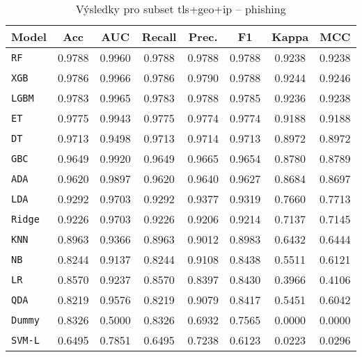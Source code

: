 \begin{table}[H]
  \centering
  \small
  \caption{Výsledky pro subset tls+geo+ip – phishing}
  \begin{tabular}{|l|c|c|c|c|c|c|c|}
    \hline
    \textbf{Model} & \textbf{Acc} & \textbf{AUC} & \textbf{Recall} & \textbf{Prec.} & \textbf{F1} & \textbf{Kappa} & \textbf{MCC} \\
    \hline
    \texttt{RF} & 0.9788 & 0.9960 & 0.9788 & 0.9788 & 0.9788 & 0.9238 & 0.9238 \\
    \texttt{XGB} & 0.9786 & 0.9966 & 0.9786 & 0.9790 & 0.9788 & 0.9244 & 0.9246 \\
    \texttt{LGBM} & 0.9783 & 0.9965 & 0.9783 & 0.9788 & 0.9785 & 0.9236 & 0.9238 \\
    \texttt{ET} & 0.9775 & 0.9943 & 0.9775 & 0.9774 & 0.9774 & 0.9188 & 0.9188 \\
    \texttt{DT} & 0.9713 & 0.9498 & 0.9713 & 0.9714 & 0.9713 & 0.8972 & 0.8972 \\
    \texttt{GBC} & 0.9649 & 0.9920 & 0.9649 & 0.9665 & 0.9654 & 0.8780 & 0.8789 \\
    \texttt{ADA} & 0.9620 & 0.9897 & 0.9620 & 0.9640 & 0.9627 & 0.8684 & 0.8697 \\
    \texttt{LDA} & 0.9292 & 0.9703 & 0.9292 & 0.9377 & 0.9319 & 0.7660 & 0.7713 \\
    \texttt{Ridge} & 0.9226 & 0.9703 & 0.9226 & 0.9206 & 0.9214 & 0.7137 & 0.7145 \\
    \texttt{KNN} & 0.8963 & 0.9366 & 0.8963 & 0.9012 & 0.8983 & 0.6432 & 0.6444 \\
    \texttt{NB} & 0.8244 & 0.9137 & 0.8244 & 0.9108 & 0.8438 & 0.5511 & 0.6121 \\
    \texttt{LR} & 0.8570 & 0.9237 & 0.8570 & 0.8397 & 0.8430 & 0.3966 & 0.4106 \\
    \texttt{QDA} & 0.8219 & 0.9576 & 0.8219 & 0.9079 & 0.8417 & 0.5451 & 0.6042 \\
    \texttt{Dummy} & 0.8326 & 0.5000 & 0.8326 & 0.6932 & 0.7565 & 0.0000 & 0.0000 \\
    \texttt{SVM-L} & 0.6495 & 0.7851 & 0.6495 & 0.7238 & 0.6123 & 0.0223 & 0.0296 \\
    \hline
  \end{tabular}
\end{table}
\vspace{0.5cm}

